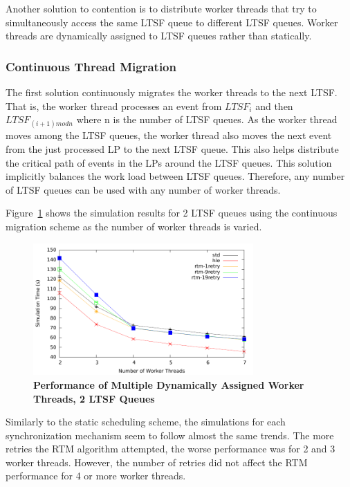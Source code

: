 \documentclass[11pt]{book}
\begin{document}
Another solution to contention is to distribute worker threads that try to simultaneously
access the same LTSF queue to different LTSF queues.  Worker threads are dynamically
assigned to LTSF queues rather than statically.

\subsubsection{Continuous Thread Migration}

The first solution continuously migrates the worker threads to the next LTSF.  That is, the
worker thread processes an event from $LTSF_i$ and then $LTSF_{(i+1)mod n}$ where n is the
number of LTSF queues.  As the worker thread moves among the LTSF queues, the worker
thread also moves the next event from the just processed LP to the next LTSF queue.  This
also helps distribute the critical path of events in the LPs around the LTSF queues.  This
solution implicitly balances the work load between LTSF queues.  Therefore, any number of
LTSF queues can be used with any number of worker threads.  

Figure~\ref{fig:contThrMig_timeVSthreads_2schQ} shows the simulation results for 
2 LTSF queues using the continuous migration scheme as the number of worker threads is varied.

\begin{figure}
    \centering
    \graphicspath{ {./figures/} }
    \includegraphics[width=0.75\textwidth,keepaspectratio]{hugeepidemicsim-CONTmig-timeVSthreads-multiset-2schQ}
    \caption{\textbf{Performance of Multiple Dynamically Assigned Worker Threads, 2 LTSF Queues}}
    \label{fig:contThrMig_timeVSthreads_2schQ}
\end{figure}

Similarly to the static scheduling scheme, the simulations for each
synchronization mechanism seem to follow almost the same trends.  The more
retries the RTM algorithm attempted, the worse performance was for 2 and 3
worker threads.  However, the number of retries did not affect the RTM
performance for 4 or more worker threads.
\end{document}
